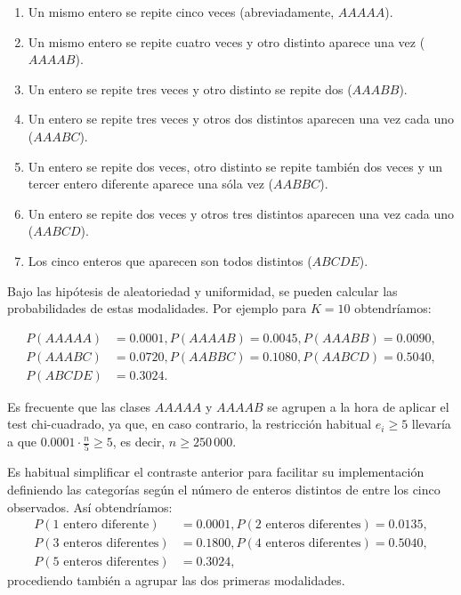 \documentclass[
]{book}
\theoremstyle{break}
\theoremstyle{definition}
\theoremstyle{definition}
\theoremstyle{definition}
\theoremstyle{remark}
\begin{document}
\begin{enumerate}
\def\labelenumi{\arabic{enumi}.}
\item
  Un mismo entero se repite cinco veces (abreviadamente, \(AAAAA\)).
\item
  Un mismo entero se repite cuatro veces y otro distinto aparece una
  vez (\(AAAAB\)).
\item
  Un entero se repite tres veces y otro distinto se repite dos
  (\(AAABB\)).
\item
  Un entero se repite tres veces y otros dos distintos aparecen una
  vez cada uno (\(AAABC\)).
\item
  Un entero se repite dos veces, otro distinto se repite también dos
  veces y un tercer entero diferente aparece una sóla vez (\(AABBC\)).
\item
  Un entero se repite dos veces y otros tres distintos aparecen una
  vez cada uno (\(AABCD\)).
\item
  Los cinco enteros que aparecen son todos distintos (\(ABCDE\)).
\end{enumerate}

Bajo las hipótesis de aleatoriedad y uniformidad, se pueden calcular las probabilidades de estas modalidades. Por ejemplo para \(K=10\) obtendríamos:

\[\begin{aligned}
P(AAAAA) & =0.0001, P(AAAAB)=0.0045, P(AAABB)=0.0090,\\
P(AAABC) & =0.0720, P(AABBC)=0.1080, P(AABCD)=0.5040,\\
P(ABCDE) & =0.3024.
\end{aligned}\]

Es frecuente que las clases \(AAAAA\) y \(AAAAB\) se agrupen a la hora de
aplicar el test chi-cuadrado, ya que, en caso contrario, la restricción
habitual \(e_{i}\geq5\) llevaría a que \(0.0001\cdot\frac{n}{5}\geq5\), es
decir, \(n\geq250\,000\).

Es habitual simplificar el contraste anterior para facilitar su implementación definiendo las categorías según el número de enteros distintos de entre los cinco observados.
Así obtendríamos:
\[\begin{aligned}
P(\text{1 entero diferente}) & = 0.0001,
P(\text{2 enteros diferentes}) = 0.0135,\\
P(\text{3 enteros diferentes}) & = 0.1800, 
P(\text{4 enteros diferentes}) = 0.5040,\\
P(\text{5 enteros diferentes}) & = 0.3024,
\end{aligned}\]
procediendo también a agrupar las dos primeras modalidades.
\end{document}
